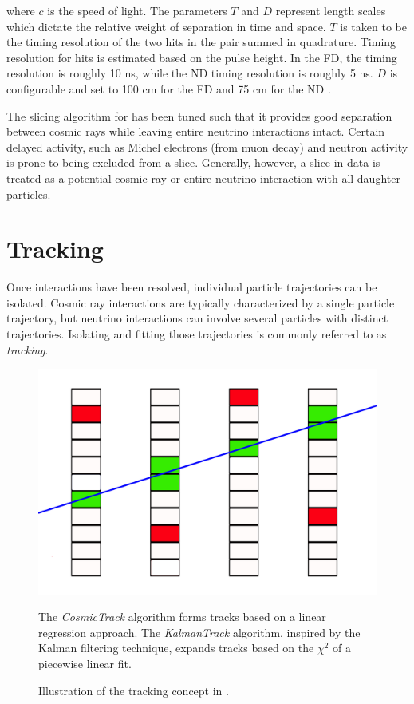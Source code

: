 where $c$ is the speed of light.  The parameters $T$ and $D$ represent
length scales which dictate the relative weight of separation in time and
space.
$T$ is taken to be the timing resolution  of the two hits
in the pair summed in quadrature.
Timing resolution for hits is estimated based on the pulse height.
In the FD,
the timing resolution is roughly 10 ns, while the ND timing resolution
is roughly 5 ns.
$D$ is configurable and set to 100 cm for the FD and 75 cm for the ND
\cite{baird2015thesis}.

The slicing algorithm for \nova has been tuned such that it provides good
separation between cosmic rays while leaving entire neutrino interactions
intact.  Certain delayed activity, such as Michel electrons (from muon decay)
and neutron activity is prone to being excluded from a slice.
Generally, however, a slice in \nova data is treated as a potential cosmic ray
or entire neutrino interaction with all daughter particles.


\section{Tracking}

Once interactions have been resolved, individual particle trajectories can be
isolated.
Cosmic ray interactions are typically characterized by a single particle
trajectory, but neutrino interactions can involve several particles with
distinct trajectories.
Isolating and fitting those trajectories is commonly referred to as
\textit{tracking}.

\begin{figure}[t]
\begin{center}
\includegraphics[width=\textwidth]{figures/figures/tracking.jpg}
\end{center}
\caption{Illustration of the tracking concept in \nova.}{The \textit{CosmicTrack} algorithm forms tracks
 based on a linear regression approach.  The \textit{KalmanTrack} algorithm,
 inspired by the Kalman filtering technique, expands tracks based on the
 $\chi^2$ of a piecewise linear fit.}
\label{tracking}
\end{figure}

